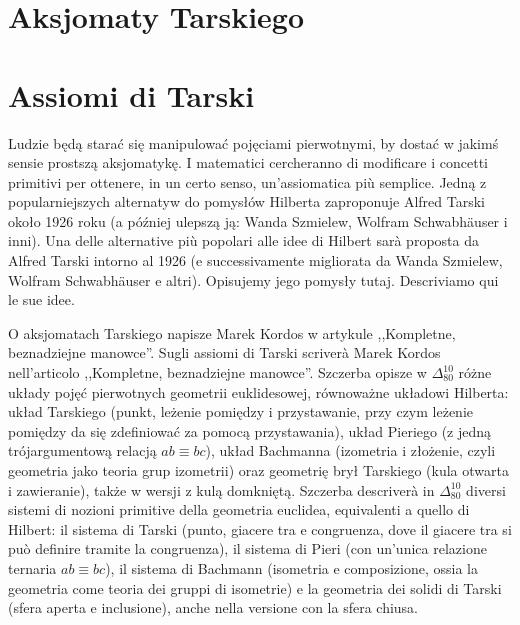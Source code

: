 %

\section{Aksjomaty Tarskiego} %
\section{Assiomi di Tarski} %

Ludzie będą starać się manipulować pojęciami pierwotnymi, by dostać w jakimś sensie prostszą aksjomatykę. %
I matematici cercheranno di modificare i concetti primitivi per ottenere, in un certo senso, un'assiomatica più semplice. %
Jedną z popularniejszych alternatyw do pomysłów Hilberta zaproponuje Alfred Tarski około 1926 roku (a później ulepszą ją: Wanda Szmielew, Wolfram Schwabhäuser i inni). %
Una delle alternative più popolari alle idee di Hilbert sarà proposta da Alfred Tarski intorno al 1926 (e successivamente migliorata da Wanda Szmielew, Wolfram Schwabhäuser e altri). %
Opisujemy jego pomysły tutaj. %
Descriviamo qui le sue idee. %

O aksjomatach Tarskiego napisze Marek Kordos w artykule ,,Kompletne, beznadziejne manowce''. %
Sugli assiomi di Tarski scriverà Marek Kordos nell'articolo ,,Kompletne, beznadziejne manowce''. %
Szczerba opisze w $\Delta_{80}^{10}$ różne układy pojęć pierwotnych geometrii euklidesowej, równoważne układowi Hilberta: układ Tarskiego (punkt, leżenie pomiędzy i przystawanie, przy czym leżenie pomiędzy da się zdefiniować za pomocą przystawania), układ Pieriego (z jedną trójargumentową relacją $ab \equiv bc$), układ Bachmanna (izometria i złożenie, czyli geometria jako teoria grup izometrii) oraz geometrię brył Tarskiego (kula otwarta i zawieranie), także w wersji z kulą domkniętą. %
Szczerba descriverà in $\Delta_{80}^{10}$ diversi sistemi di nozioni primitive della geometria euclidea, equivalenti a quello di Hilbert: il sistema di Tarski (punto, giacere tra e congruenza, dove il giacere tra si può definire tramite la congruenza), il sistema di Pieri (con un'unica relazione ternaria $ab \equiv bc$), il sistema di Bachmann (isometria e composizione, ossia la geometria come teoria dei gruppi di isometrie) e la geometria dei solidi di Tarski (sfera aperta e inclusione), anche nella versione con la sfera chiusa. %

